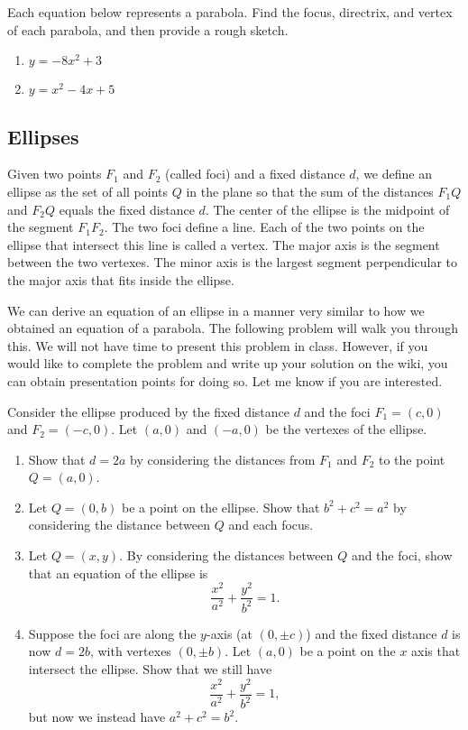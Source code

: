 \begin{problem}
Each equation below represents a parabola.  Find the focus, directrix, and vertex of each parabola, and then provide a rough sketch.
\begin{enumerate}
\item $y=-8x^2+3$
\item $y=x^2-4x+5$
\end{enumerate}
\end{problem}

\subsection{Ellipses}

\begin{definition}
Given two points $F_1$ and $F_2$ (called foci) and a fixed distance $d$, we define an ellipse as the set of all points $Q$ in the plane so that the sum of the distances $F_1Q$  and $F_2Q$ equals the fixed distance $d$. The center of the ellipse is the midpoint of the segment $F_1F_2$. The two foci define a line.  Each of the two points on the ellipse that intersect this line is called a vertex. The major axis is the segment between the two vertexes. The minor axis is the largest segment perpendicular to the major axis that fits inside the ellipse.
\end{definition}

We can derive an equation of an ellipse in a manner very similar to how we obtained an equation of a parabola.  The following problem will walk you through this.  We will not have time to present this problem in class. However, if you would like to complete the problem and write up your solution on the wiki, you can obtain presentation points for doing so.  Let me know if you are interested. 

\begin{problem*}[Optional]
Consider the ellipse produced by the fixed distance $d$ and the foci $F_1=(c,0)$ and $F_2=(-c,0)$. Let $(a,0)$ and $(-a,0)$ be the vertexes of the ellipse.
\begin{enumerate}
\item Show that $d=2a$ by considering the distances from $F_1$ and $F_2$ to the point $Q=(a,0)$.
\item Let $Q=(0,b)$ be a point on the ellipse.  Show that $b^2+c^2=a^2$ by considering the distance between $Q$ and each focus.
\item Let $Q=(x,y)$. By considering the distances between $Q$ and the foci, show that an equation of the ellipse is $$\frac{x^2}{a^2}+\frac{y^2}{b^2}=1.$$
\item Suppose the foci are along the $y$-axis (at $(0,\pm c)$) and the fixed distance $d$ is now $d=2b$, with vertexes $(0,\pm b)$. Let $(a,0)$ be a point on the $x$ axis that intersect the ellipse.  Show that we still have $$\frac{x^2}{a^2}+\frac{y^2}{b^2}=1,$$ but now we instead have $a^2+c^2=b^2$.
\end{enumerate}
\end{problem*}

